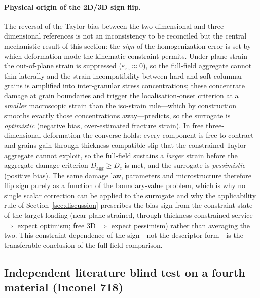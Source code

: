 \documentclass[12pt,a4paper,twocolumn]{article}
\begin{document}
\paragraph{Physical origin of the 2D/3D sign flip.}
The reversal of the Taylor bias between the two-dimensional and three-dimensional references is not an
inconsistency to be reconciled but the central mechanistic result of this section: the \emph{sign} of the
homogenization error is set by which deformation mode the kinematic constraint permits. Under plane strain the
out-of-plane strain is suppressed ($\varepsilon_{zz}\approx0$), so the full-field aggregate cannot thin laterally and
the strain incompatibility between hard and soft columnar grains is amplified into inter-granular stress
concentrations; these concentrate damage at grain boundaries and trigger the localisation-onset criterion at a
\emph{smaller} macroscopic strain than the iso-strain rule---which by construction smooths exactly those
concentrations away---predicts, so the surrogate is \emph{optimistic} (negative bias, over-estimated fracture strain).
In free three-dimensional deformation the converse holds: every component is free to contract and grains gain
through-thickness compatible slip that the constrained Taylor aggregate cannot exploit, so the full-field sustains a
\emph{larger} strain before the aggregate-damage criterion $D_{\mathrm{agg}}\ge D_c$ is met, and the surrogate is
\emph{pessimistic} (positive bias). The same damage law, parameters and microstructure therefore flip sign purely as a
function of the boundary-value problem, which is why no single scalar correction can be applied to the surrogate and why
the applicability rule of Section~\ref{sec:discussion} prescribes the bias sign from the constraint state of the target
loading (near-plane-strained, through-thickness-constrained service $\Rightarrow$ expect optimism; free 3D
$\Rightarrow$ expect pessimism) rather than averaging the two. This constraint-dependence of the sign---not the descriptor
form---is the transferable conclusion of the full-field comparison.

\subsection{Independent literature blind test on a fourth material (Inconel 718)}
\label{sec:in718_blind}
\end{document}
